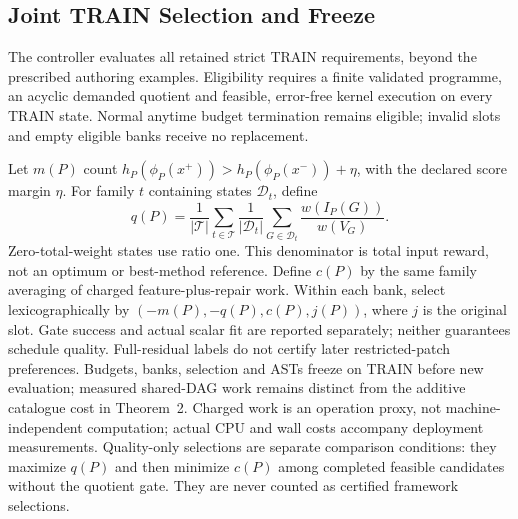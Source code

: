 \subsection{Joint TRAIN Selection and Freeze}
\label{sec:method:selection}
The controller evaluates all retained strict TRAIN requirements, beyond the
prescribed authoring examples. Eligibility requires a finite validated
programme, an acyclic demanded quotient and feasible, error-free kernel
execution on every TRAIN state. Normal anytime budget termination remains
eligible; invalid slots and empty eligible banks receive no replacement.

Let $m(P)$ count $h_P(\phi_P(x^+))>h_P(\phi_P(x^-))+\eta$, with the declared
score margin $\eta$. For family $t$ containing states $\mathcal D_t$, define
\begin{equation}
 q(P)=\frac1{|\mathcal T|}\sum_{t\in\mathcal T}\frac1{|\mathcal D_t|}
      \sum_{G\in\mathcal D_t}\frac{w(I_P(G))}{w(V_G)}.
 \label{eq:train-macro-quality}
\end{equation}
Zero-total-weight states use ratio one. This denominator is total input
reward, not an optimum or best-method reference. Define $c(P)$ by the same
family averaging of charged feature-plus-repair work. Within each bank,
select lexicographically by $(-m(P),-q(P),c(P),j(P))$, where $j$ is the original
slot. Gate success and actual scalar fit are reported separately; neither
guarantees schedule quality. Full-residual labels do not certify later
restricted-patch preferences. Budgets, banks, selection and ASTs freeze on
TRAIN before new evaluation; measured shared-DAG work remains distinct from
the additive catalogue cost in Theorem~2.
Charged work is an operation proxy, not machine-independent computation;
actual CPU and wall costs accompany deployment measurements.
Quality-only selections are separate comparison conditions: they maximize
$q(P)$ and then minimize $c(P)$ among completed feasible candidates without
the quotient gate. They are never counted as certified framework selections.
